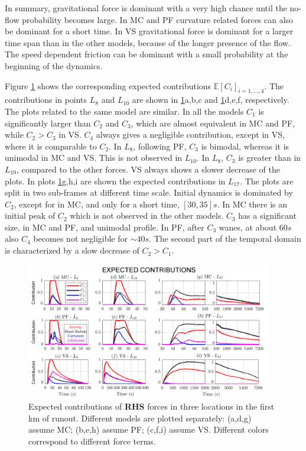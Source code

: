 \documentclass{article}
\begin{document}
In summary, gravitational force is dominant with a very high chance until the no-flow probability becomes large. In MC and PF curvature related forces can also be dominant for a short time. In VS gravitational force is dominant for a larger time span than in the other models, because of the longer presence of the flow. The speed dependent friction can be dominant with a small probability at the beginning of the dynamics.

Figure \ref{fig:Colima-Ci_1} shows the corresponding expected contributions $\mathbb E[C_i]_{i=1,\dots,4}$. The contributions in points $L_8$ and $L_{10}$ are shown in \ref{fig:Colima-Ci_1}a,b,c and \ref{fig:Colima-Ci_1}d,e,f, respectively. The plots related to the same model are similar. In all the models $C_1$ is significantly larger than $C_2$ and $C_3$, which are almost equivalent in MC and PF, while $C_2>C_3$ in VS. $C_4$ always gives a negligible contribution, except in VS, where it is comparable to $C_2$. In $L_8$, following PF, $C_3$ is bimodal, whereas it is unimodal in MC and VS. This is not observed in $L_{10}$. In $L_8$, $C_3$ is greater than in $L_{10}$, compared to the other forces. VS always shows a slower decrease of the plots. In plots \ref{fig:Colima-Ci_1}g,h,i are shown the expected contributions in $L_{17}$. The plots are split in two sub-frames at different time scale. Initial dynamics is dominated by $C_2$, except for in MC, and only for a short time, $[30, 35] s$. In MC there is an initial peak of $C_2$ which is not observed in the other models. $C_3$ has a significant size, in MC and PF, and unimodal profile. In PF, after $C_3$ wanes, at about $60 s$ also $C_4$ becomes not negligible for $\sim 40 s$. The second part of the temporal domain is characterized by a slow decrease of $C_2>C_1$.
\begin{figure}[H]
         \centering
        \includegraphics[width=0.95\textwidth]{figures/Colima/Ci1_total.png}
        \caption{Expected contributions of \textbf{RHS} forces in three locations in the first km of runout. Different models are plotted separately: (a,d,g) assume MC; (b,e,h) assume PF; (c,f,i) assume VS. Different colors correspond to different force terms.}
        \label{fig:Colima-Ci_1}
\end{figure}
\end{document}
